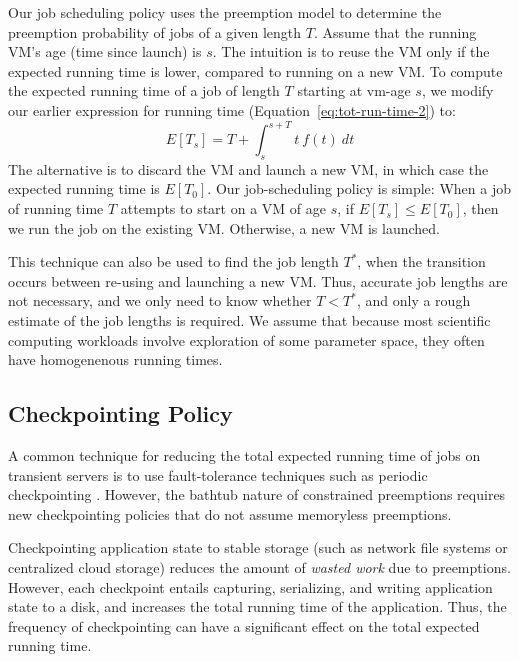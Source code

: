 \documentclass[sigconf]{acmart} %
\newcommand{\subsecspace}[0]{-0.20cm}
\begin{document}
Our job scheduling policy uses the preemption model to determine the preemption probability of jobs of a given length $T$. 
Assume that the running VM's age (time since launch) is $s$.
The intuition is to reuse the VM only if the expected running time is lower, compared to running on a new VM. 
To compute the expected running time of a job of length $T$ starting at vm-age $s$, we  modify our earlier expression for running time (Equation~\ref{eq:tot-run-time-2}) to: 
\begin{equation}
  \label{eq:tot-run-time-s}
    E[T_s]  = T + \int_{s}^{s+T} t~f(t)~dt
  \end{equation}
The alternative is to discard the VM and launch a new VM, in which case the expected running time is $E[T_0]$. Our job-scheduling policy is simple: 
When a job of running time $T$ attempts to start on a VM of age $s$, if $E[T_s] \leq E[T_0]$, then we run the job on the existing VM.
Otherwise, a new VM is launched.
  
This technique can also be used to find the job length $T^*$, when the transition occurs between re-using and launching a new VM.
Thus, accurate job lengths are not necessary, and we only need to know whether $T<T^*$, and only a rough estimate of the job lengths is required. 
We assume that because most scientific computing workloads involve exploration of some parameter space, they often have homogenenous running times. 

\vspace*{\subsecspace}
\subsection{Checkpointing Policy}

A common technique for reducing the total expected running time of jobs on transient servers is to use fault-tolerance techniques such as periodic checkpointing \cite{flint}.
However, the bathtub nature of constrained preemptions requires new checkpointing policies that do not assume memoryless preemptions. 

Checkpointing application state to stable storage (such as network file systems or centralized cloud storage) reduces the amount of \emph{wasted work} due to preemptions.
However, each checkpoint entails capturing, serializing, and writing application state to a disk, and increases the total running time of the application.
Thus, the frequency of checkpointing can have a significant effect on the total expected running time.
\end{document}
